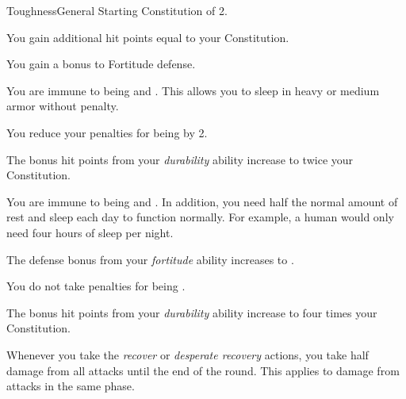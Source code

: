     \begin{feat}{Toughness}{General}
        \featpre Starting Constitution of 2.

         You gain additional hit points equal to your Constitution.

         You gain a  bonus to Fortitude defense.

         You are immune to being  and .
        This allows you to sleep in heavy or medium armor without penalty.

         You reduce your penalties for being  by 2.

         The bonus hit points from your \textit{durability} ability increase to twice your Constitution.

         You are immune to being  and .
        In addition, you need half the normal amount of rest and sleep each day to function normally.
        For example, a human would only need four hours of sleep per night.

         The defense bonus from your \textit{fortitude} ability increases to .

         You do not take penalties for being .

         The bonus hit points from your \textit{durability} ability increase to four times your Constitution.

         Whenever you take the \textit{recover} or \textit{desperate recovery} actions, you take half damage from all attacks until the end of the round.
        This applies to damage from attacks in the same phase.
    \end{feat}

